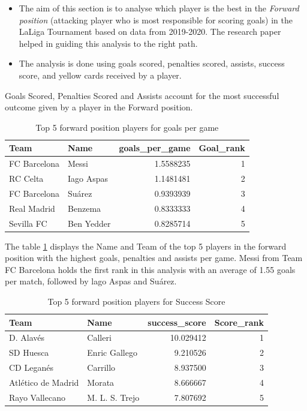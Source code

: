 \documentclass[11pt,a4paper,]{article}
\begin{document}
\begin{itemize}
\item
  The aim of this section is to analyse which player is the best in the \emph{Forward position} (attacking player who is most responsible for scoring goals) in the LaLiga Tournament based on data from 2019-2020. The research paper \textcite{majewski2016identification} helped in guiding this analysis to the right path.
\item
  The analysis is done using goals scored, penalties scored, assists, success score, and yellow cards received by a player.
\end{itemize}

Goals Scored, Penalties Scored and Assists account for the most successful outcome given by a player in the Forward position.

\begin{table}[H]

\caption{\label{tab:Goals-Analysis}Top 5 forward position players for goals per game}
\centering
\begin{tabular}[t]{l|l|r|r}
\hline
Team & Name & goals\_per\_game & Goal\_rank\\
\hline
FC Barcelona & Messi & 1.5588235 & 1\\
\hline
RC Celta & Iago Aspas & 1.1481481 & 2\\
\hline
FC Barcelona & Suárez & 0.9393939 & 3\\
\hline
Real Madrid & Benzema & 0.8333333 & 4\\
\hline
Sevilla FC & Ben Yedder & 0.8285714 & 5\\
\hline
\end{tabular}
\end{table}

The table \ref{tab:Goals-Analysis} displays the Name and Team of the top 5 players in the forward position with the highest goals, penalties and assists per game. Messi from Team FC Barcelona holds the first rank in this analysis with an average of 1.55 goals per match, followed by lago Aspas and Suárez.

\begin{table}[H]

\caption{\label{tab:Success-Scores}Top 5 forward position players for Success Score}
\centering
\begin{tabular}[t]{l|l|r|r}
\hline
Team & Name & success\_score & Score\_rank\\
\hline
D. Alavés & Calleri & 10.029412 & 1\\
\hline
SD Huesca & Enric Gallego & 9.210526 & 2\\
\hline
CD Leganés & Carrillo & 8.937500 & 3\\
\hline
Atlético de Madrid & Morata & 8.666667 & 4\\
\hline
Rayo Vallecano & M. L. S. Trejo & 7.807692 & 5\\
\hline
\end{tabular}
\end{table}
\end{document}
